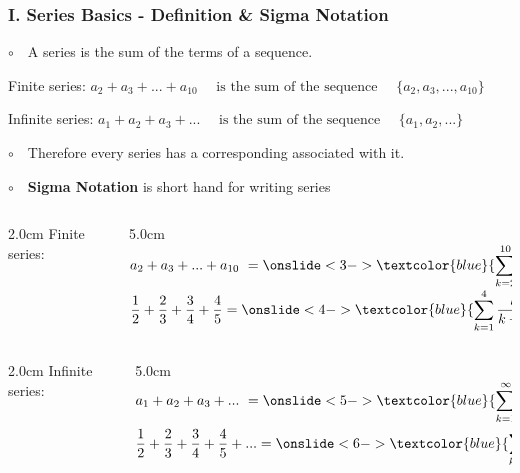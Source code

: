 \begin{frame}
\frametitle{I. Series Basics - Definition \& Sigma Notation}
\scriptsize

$\circ$ \,\, A series is the sum of the terms of a sequence. \\

\vspace{0.2cm}

\qquad Finite series: \qquad
$\displaystyle{a_2+a_3+...+a_{10} \quad \text{ is the sum of the sequence } \quad \{a_2, a_3, ..., a_{10}\}}$

\vspace{0.2cm}

\qquad Infinite series: \qquad
$\displaystyle{a_1+a_2+a_3+... \quad \text{ is the sum of the sequence } \quad \{a_1, a_2, ...\}}$

\vspace{0.4cm}

$\circ$ \,\, Therefore every series has a corresponding \quad {} \quad associated with it. 

\vspace{0.4cm}

$\circ$ \,\, {\bf Sigma Notation} is short hand for writing series \\

\vspace{0.4cm}

\begin{columns}
\begin{column}{2.0cm}
	Finite series: \\
	\vspace{1.2cm}
\end{column}
\begin{column}{5.0cm}
	$\displaystyle{a_2+a_3+...+a_{10} \,\,= \onslide<3->{\textcolor{blue}{\sum \limits_{k=2}^{10} a_k}}}$ \\
	\vspace{0.2cm}
	$\displaystyle{\frac{1}{2} + \frac{2}{3} + \frac{3}{4} + \frac{4}{5} = \onslide<4->{\textcolor{blue}{\sum \limits_{k=1}^{4} \frac{k}{k+1}}}}$
\end{column}
\end{columns}

\vspace{0.2cm}

\begin{columns}
\begin{column}{2.0cm}
	Infinite series: \\
	\vspace{1.2cm}
\end{column}
\begin{column}{5.0cm}
	$\displaystyle{a_1+a_2+a_3+... \,\,= \onslide<5->{\textcolor{blue}{\sum \limits_{k=1}^{\infty} a_k}}}$ \\
	\vspace{0.2cm}
	$\displaystyle{\frac{1}{2} + \frac{2}{3} + \frac{3}{4} + \frac{4}{5} + ... = \onslide<6->{\textcolor{blue}{\sum \limits_{k=1}^{\infty} \frac{k}{k+1}}}}$
\end{column}
\end{columns}


\end{frame}
